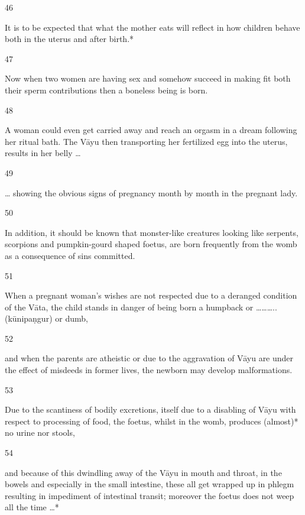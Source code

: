 \begin{translation}
\begin{tt}
\item[46]

 It is to be expected that what the mother eats will reflect in how 
  children behave both in the uterus and after birth.*
  
\item[47]

 Now when two women are having sex and somehow succeed in making 
  fit both their sperm contributions then a boneless being is born.
  
\item[48]

A woman could even get carried away and reach an orgasm in a dream 
  following her ritual bath. The Vāyu then transporting her fertilized egg into the 
  uterus, results in her belly …
  
\item[49]

 … showing the obvious signs of pregnancy month by month in the 
  pregnant lady.
  
\item[50]

In addition, it should be known that monster-like creatures looking like 
  serpents, scorpions and pumpkin-gourd shaped foetus, are born frequently from 
  the womb as a consequence of sins committed.
  
\item[51]

When a pregnant woman’s wishes are not respected due to a deranged 
  condition of the Vāta, the child stands in danger of being born a humpback or 
  ……….. (kūnipaṇgur) or dumb,
  
\item[52]

and when the parents are atheistic or due to the aggravation of Vāyu are 
  under the effect of misdeeds in former lives, the newborn may develop 
  malformations.
  
\item[53]

 Due to the scantiness of bodily excretions, itself due to a disabling of 
  Vāyu with respect to processing of food, the foetus, whilst in the womb, 
  produces (almost)* no urine nor stools, 
  
\item[54]

 and because of this dwindling away of the Vāyu in mouth and throat, in 
  the bowels and especially in the small intestine, these all get wrapped up in 
  phlegm resulting in impediment of intestinal transit; moreover the foetus does 
  not weep all the time …*
  

\end{tt}
\end{translation}
